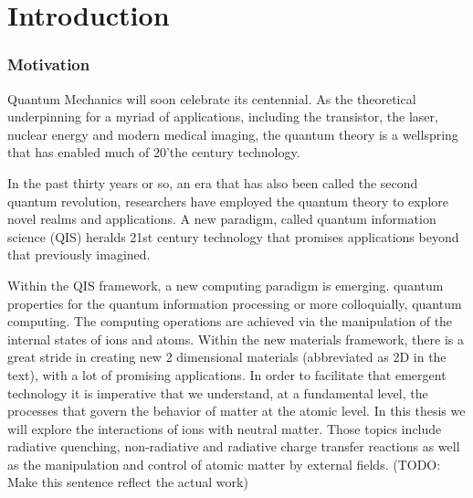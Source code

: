 \selectfont
\setcounter{chapter}{0}
\chapter*{\textbf{Introduction}}

\label{introduction}
 
\subsection*{Motivation}

Quantum Mechanics will soon celebrate its centennial. As the theoretical underpinning for a myriad of applications, including the transistor, the laser, nuclear energy and modern medical imaging, the quantum theory is a wellspring that has enabled much  of 20'the century technology.

In the past thirty years or so, an era that has also been called the second quantum revolution, researchers have
employed the quantum theory to explore novel realms and applications. A new paradigm, called quantum information science (QIS) heralds 21st century technology that promises applications beyond that previously imagined.




Within the QIS  framework, a new computing paradigm is emerging.  quantum properties for the quantum information processing \cite{QIP} or more colloquially, quantum computing. The computing operations are achieved via the manipulation of the internal states of ions and atoms. Within the new materials framework, there is a great stride in creating new 2 dimensional materials (abbreviated as 2D in the text), with a lot of promising applications.\cite{Nature2D}
In order to facilitate that emergent technology it is imperative that we understand, at a fundamental level, the processes that govern the behavior of matter at the atomic level. In this thesis we will explore the interactions of ions with neutral matter. Those topics include radiative quenching, non-radiative and radiative charge transfer reactions as well as the manipulation and control of atomic matter by external fields. (TODO: Make this sentence reflect the actual work)

